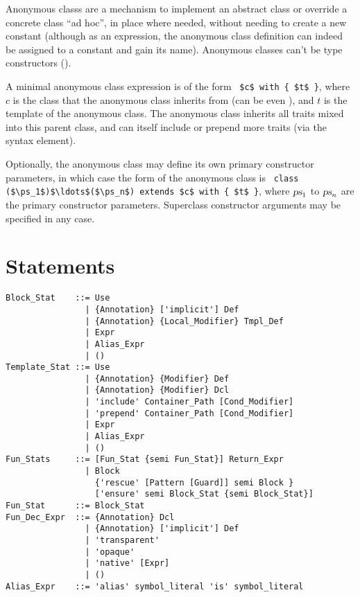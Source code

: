 Anonymous classs are a mechanism to implement an abstract class or override a concrete class ``ad hoc'', in place where needed, without needing to create a new constant (although as an expression, the anonymous class definition can indeed be assigned to a constant and gain its name). Anonymous classes can't be type constructors (). 

A minimal anonymous class expression is of the form ~\lstinline!$c$ with { $t$ }!, where $c$ is the class that the anonymous class inherits from (can be even ), and $t$ is the template of the anonymous class. The anonymous class inherits all traits mixed into this parent class, and can itself include or prepend more traits (via the  syntax element). 

Optionally, the anonymous class may define its own primary constructor parameters, in which case the form of the anonymous class is ~\lstinline!class ($\ps_1$)$\ldots$($\ps_n$) extends $c$ with { $t$ }!, where $\mbox{\sl ps}_1$ to $\mbox{\sl ps}_n$ are the primary constructor parameters. Superclass constructor arguments may be specified in any case. 






\section{Statements}
\label{sec:statements}

\syntax\begin{lstlisting}
Block_Stat    ::= Use
                | {Annotation} ['implicit'] Def
                | {Annotation} {Local_Modifier} Tmpl_Def
                | Expr
                | Alias_Expr
                | ()
Template_Stat ::= Use
                | {Annotation} {Modifier} Def
                | {Annotation} {Modifier} Dcl
                | 'include' Container_Path [Cond_Modifier]
                | 'prepend' Container_Path [Cond_Modifier]
                | Expr
                | Alias_Expr
                | ()
Fun_Stats     ::= [Fun_Stat {semi Fun_Stat}] Return_Expr
                | Block
                  {'rescue' [Pattern [Guard]] semi Block }
                  ['ensure' semi Block_Stat {semi Block_Stat}]
Fun_Stat      ::= Block_Stat
Fun_Dec_Expr  ::= {Annotation} Dcl
                | {Annotation} ['implicit'] Def
                | 'transparent'
                | 'opaque'
                | 'native' [Expr]
                | ()
Alias_Expr    ::= 'alias' symbol_literal 'is' symbol_literal
\end{lstlisting}

